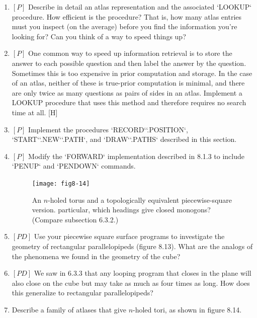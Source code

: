 \documentclass{book}
\begin{document}
\begin{enumerate}
\item $[P]$ Describe in detail an atlas representation and the associated
\textsc{`LOOKUP`} procedure. How efficient is the procedure? That is, how many
atlas entries must you inspect (on the average) before you find the
information you're looking for? Can you think of a way to speed things
up?

\item $[P]$ One common way to speed up information retrieval is to store
the answer to each possible question and then label the answer by
the question. Sometimes this is too expensive in prior computation
and storage. In the case of an atlas, neither of these is true-prior
computation is minimal, and there are only twice as many questions as
pairs of sides in an atlas. Implement a LOOKUP procedure that uses this
method and therefore requires no search time at all. [H]

\item $[P]$ Implement the procedures \textsc{`RECORD`}\textsc{`.POSITION`}, \textsc{`START`}\textsc{`.NEW`}\textsc{`.PATH`},
and \textsc{`DRAW`}\textsc{`.PATHS`} described in this section.

\item $[P]$ Modify the \textsc{`FORWARD`} implementation described in 8.1.3 to include
\textsc{`PENUP`} and \textsc{`PENDOWN`} commands.

\begin{figure}
\begin{center}
\texttt{[image: fig8-14]}
\caption{An $n$-holed torus and a topologically equivalent piecewise-square version. particular, which headings give closed monogons? (Compare subsection 6.3.2.)}
\end{center}
\end{figure}

\item $[PD]$ Use your piecewise square surface programs to investigate the
geometry of rectangular parallelopipeds (figure 8.13). What are the
analogs of the phenomena we found in the geometry of the cube? 

\item $[PD]$ We saw in 6.3.3 that any looping program that closes in the
plane will also close on the cube but may take as much as four times as
long. How does this generalize to rectangular parallelopipeds?

\item Describe a family of atlases that give $n$-holed tori, as shown in figure
8.14.


\end{enumerate}
\end{document}
